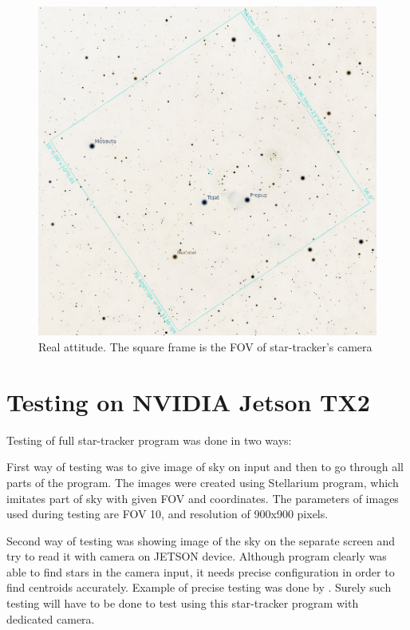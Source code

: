 \documentclass[12pt,a4paper,twoside]{article}
\begin{document}
\begin{figure}[!htbp]
\includegraphics[scale=0.29]{example_4.png}
\centering
\caption[Real attitude]{Real attitude. The square frame is the FOV of star-tracker's camera}
\label{fig:example_8}
\end{figure}

\newpage
\section{Testing on NVIDIA Jetson TX2}

Testing of full star-tracker program was done in two ways:

First way of testing was to give image of sky on input and then to go through all parts of the program. The images were created using Stellarium program, which imitates part of sky with given FOV and coordinates. The parameters of images used during testing are FOV 10\degree , and resolution of 900x900 pixels.

Second way of testing was showing image of the sky on the separate screen and try to read it with camera on JETSON device. Although program clearly was able to find stars in the camera input, it needs precise configuration in order to find centroids accurately. Example of precise testing was done by \citet{tappe2011star}. Surely such testing will have to be done to test using this star-tracker program with dedicated camera.
\end{document}
